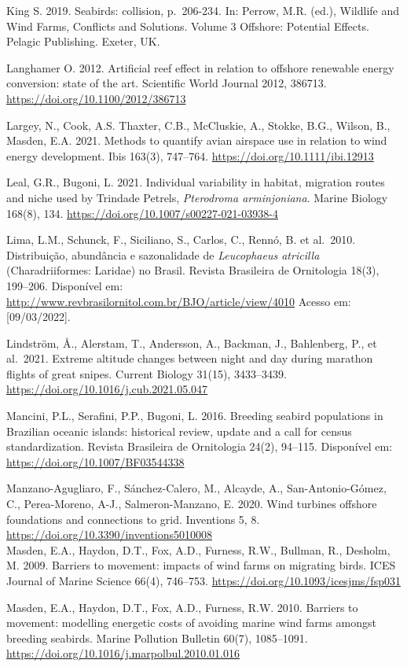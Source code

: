 \documentclass[
  oneside]{scrbook}
\begin{document}
King S. 2019. Seabirds: collision, p.~206-234. In: Perrow, M.R. (ed.), Wildlife and Wind Farms, Conflicts and Solutions. Volume 3 Offshore: Potential Effects. Pelagic Publishing. Exeter, UK.

Langhamer O. 2012. Artificial reef effect in relation to offshore renewable energy conversion: state of the art. Scientific World Journal 2012, 386713. \url{https://doi.org/10.1100/2012/386713}

Largey, N., Cook, A.S. Thaxter, C.B., McCluskie, A., Stokke, B.G., Wilson, B., Masden, E.A. 2021. Methods to quantify avian airspace use in relation to wind energy development. Ibis 163(3), 747--764. \url{https://doi.org/10.1111/ibi.12913}

Leal, G.R., Bugoni, L. 2021. Individual variability in habitat, migration routes and niche used by Trindade Petrels, \emph{Pterodroma arminjoniana}. Marine Biology 168(8), 134. \url{https://doi.org/10.1007/s00227-021-03938-4}

Lima, L.M., Schunck, F., Siciliano, S., Carlos, C., Rennó, B. et al.~2010. Distribuição, abundância e sazonalidade de \emph{Leucophaeus atricilla} (Charadriiformes: Laridae) no Brasil. Revista Brasileira de Ornitologia 18(3), 199--206. Disponível em: \url{http://www.revbrasilornitol.com.br/BJO/article/view/4010} Acesso em:{[}09/03/2022{]}.

Lindström, Å., Alerstam, T., Andersson, A., Backman, J., Bahlenberg, P., et al.~2021. Extreme altitude changes between night and day during marathon flights of great snipes. Current Biology 31(15), 3433--3439. \url{https://doi.org/10.1016/j.cub.2021.05.047}

Mancini, P.L., Serafini, P.P., Bugoni, L. 2016. Breeding seabird populations in Brazilian oceanic islands: historical review, update and a call for census standardization. Revista Brasileira de Ornitologia 24(2), 94--115. Disponível em: \url{https://doi.org/10.1007/BF03544338}

Manzano-Agugliaro, F., Sánchez-Calero, M., Alcayde, A., San-Antonio-Gómez, C., Perea-Moreno, A-J., Salmeron-Manzano, E. 2020. Wind turbines offshore foundations and connections to grid. Inventions 5, 8. \url{https://doi.org/10.3390/inventions5010008}\\
Masden, E.A., Haydon, D.T., Fox, A.D., Furness, R.W., Bullman, R., Desholm, M. 2009. Barriers to movement: impacts of wind farms on migrating birds. ICES Journal of Marine Science 66(4), 746--753. \url{https://doi.org/10.1093/icesjms/fsp031}

Masden, E.A., Haydon, D.T., Fox, A.D., Furness, R.W. 2010. Barriers to movement: modelling energetic costs of avoiding marine wind farms amongst breeding seabirds. Marine Pollution Bulletin 60(7), 1085--1091. \url{https://doi.org/10.1016/j.marpolbul.2010.01.016}
\end{document}
